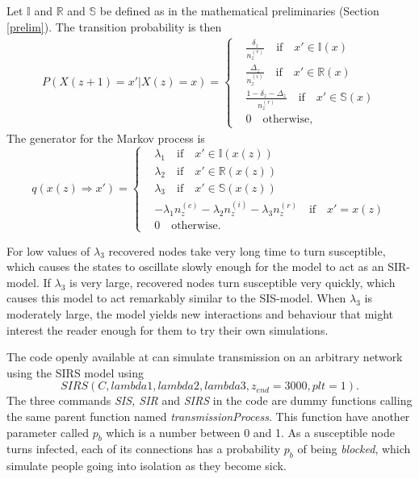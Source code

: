 \documentclass[12pt]{article} %
\numberwithin{equation}{section}
\begin{document}
Let $\mathbb{I}$ and $\mathbb{R}$ and $\mathbb{S}$ be defined as in the mathematical preliminaries (Section \ref{prelim}). The transition probability is then
\begin{equation} \label{firstPSIRS}
\begin{split}
P(X(z+1) = x' |X(z)= x) =
\begin{cases}
& \frac{\delta_z}{n_z^{(c)}}  \quad \text{if} \quad x' \in \mathbb{I}(x) \\
& \frac{\Delta_z}{n_z^{(i)}}  \quad \text{if} \quad x' \in \mathbb{R}(x) \\
& \frac{1-\delta_z-\Delta_z}{n_z^{(r)}}  \quad \text{if} \quad x' \in \mathbb{S}(x) \\
& 0 \quad \text{otherwise,}
\end{cases}
\end{split}
\end{equation}
The generator for the Markov process is
\begin{equation}\label{qSIRS}
    q(x(z)\Rightarrow x') = 
    \begin{cases}
    & \lambda_1 \quad \text{if} \quad x' \in \mathbb{I}(x(z)) \\
    & \lambda_2 \quad \text{if} \quad x' \in \mathbb{R}(x(z)) \\
    & \lambda_3 \quad \text{if} \quad x' \in \mathbb{S}(x(z)) \\
    & -\lambda_1n_z^{(c)}-\lambda_2n_z^{(i)}-\lambda_3n_z^{(r)}   \quad \text{if} \quad x' = x(z)\\
    & 0 \quad \text{otherwise.}
    \end{cases}
\end{equation}

For low values of $\lambda_3$ recovered nodes take very long time to turn susceptible, which causes the states to oscillate slowly enough for the model to act as an SIR-model. If $\lambda_3$ is very large, recovered nodes turn susceptible very quickly, which causes this model to act remarkably similar to the SIS-model. When $\lambda_3$ is moderately large, the model yields new interactions and behaviour that might interest the reader enough for them to try their own simulations.

The code openly available at \cite{github} can simulate transmission on an arbitrary network using the SIRS model using $$SIRS(C,lambda1,lambda2,lambda3,z_{end} = 3000,plt=1).$$
The three commands \textit{SIS, SIR} and \textit{SIRS} in the code are dummy functions calling the same parent function named \textit{transmissionProcess}. This function have another parameter called $p_b$ which is a number between 0 and 1. As a susceptible node turns infected, each of its connections has a probability $p_b$ of being \textit{blocked}, which simulate people going into isolation as they become sick.

{}

\end{document}
